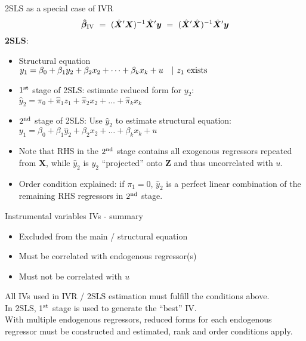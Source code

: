 \documentclass[usenames,dvipsnames]{beamer}
\begin{document}
\begin{frame}{2SLS as a special case of IVR}
$$
 \bm{\hat{\beta}}_{\textnormal{IV}} ~=~ 
 (\hat{\bm{X}}^{\prime}\bm{X})^{-1} \hat{\bm{X}}^{\prime}\bm{y} 
 ~=~ (\hat{\bm{X}}^{\prime}\hat{\bm{X}})^{-1} \hat{\bm{X}}^{\prime}\bm{y}
$$
\textbf{2SLS}: 
\begin{itemize}
\item Structural equation\\
\smallskip
$y_1=\beta_0+\beta_1 y_2+\beta_2 x_2+ \dots + \beta_k x_{k} +u \quad | ~z_1 \textnormal{~exists}$\\
\medskip
\item $1^{\textnormal{st}}$ stage of 2SLS: estimate reduced form for $y_2$:\\
\smallskip
$\hat{y}_2=\hat{\pi}_0+\hat{\pi}_1 z_1 + \hat{\pi}_{2} x_{2} + \dots +\hat{\pi}_k x_k$
\medskip
\item $2^{\textnormal{nd}}$ stage of 2SLS: Use $\hat{y}_2$ to estimate structural equation:\\
\smallskip
$y_1=\beta_0+\beta_1 \hat{y}_2 +\beta_2 x_2+ \dots + \beta_k x_{k} +u$
\smallskip
\item Note that RHS in the $2^{\textnormal{nd}}$ stage contains all exogenous regressors repeated from $\bm{X}$, while $\hat{y}_2$ is $y_2$ ``projected'' onto $\bm{Z}$ and thus uncorrelated with $u$.
\item Order condition explained: if $\pi_1=0$, $\hat{y}_2$ is a perfect linear combination of the remaining RHS regressors in $2^{\textnormal{nd}}$ stage.
\end{itemize}
\end{frame}
\begin{frame}{Instrumental variables}
IVs - summary\\
\vspace{0.3cm}
\begin{itemize}
\item Excluded from the main / structural equation
\item Must be correlated with endogenous regressor(s)
\item Must not be correlated with $u$
\end{itemize}
\vspace{0.3cm}
All IVs used in IVR / 2SLS estimation must fulfill the conditions above.\\
\vspace{0.3cm}
In 2SLS, $1^{\textnormal{st}}$ stage is used to generate the ``best'' IV.\\
With multiple endogenous regressors, reduced forms for each endogenous regressor must be constructed and estimated, rank and order conditions apply.
\end{frame}
\end{document}
